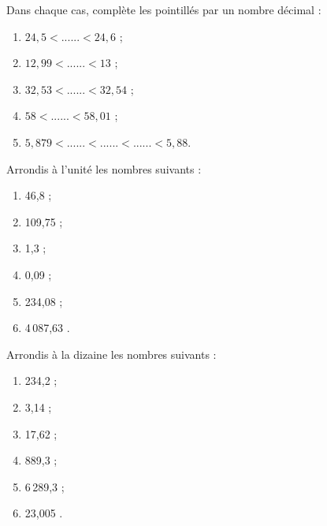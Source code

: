 \begin{exercice}
Dans chaque cas, complète les pointillés par un nombre décimal :
\begin{enumerate} 
 \item $24,5 < ...... < 24,6$ ;  
 
 \item $12,99 < ...... < 13$ ; 
 
 \item $32,53 < ...... < 32,54$ ; 
 
 \item $58 < ...... < 58,01$ ; 
 
 \item $5,879 < ...... < ...... < ...... < 5,88$. 

 \end{enumerate}
\end{exercice}


\begin{exercice}
Arrondis à l'unité les nombres suivants :
\begin{enumerate}
 \item 46,8 \dotfill ; 
 
 \item 109,75 \dotfill ; 
 
 \item 1,3 \dotfill ; 
 
 \item 0,09 \dotfill ; 
 
 \item 234,08 \dotfill ; 
 
 \item 4\,087,63 \dotfill. 
 
 \end{enumerate}
\end{exercice}


\begin{exercice}
Arrondis à la dizaine les nombres suivants :
\begin{enumerate}
 \item 234,2 \dotfill ; 
 
 \item 3,14 \dotfill ; 
 
 \item 17,62 \dotfill ; 
 
 \item 889,3 \dotfill ; 
 
 \item 6\,289,3 \dotfill ; 
 
 \item 23,005 \dotfill. 
 
 \end{enumerate}
\end{exercice}


